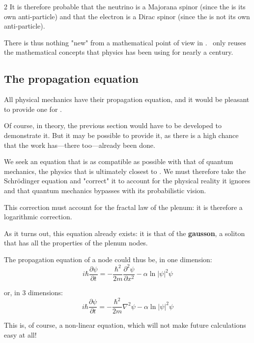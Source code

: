 \begin{multicols}{2}
	It is therefore probable that the neutrino is a Majorana spinor (since the  is its own anti-particle) and that the electron is a Dirac spinor (since the  is not its own anti-particle).
	
	There is thus nothing "new" from a mathematical point of view in \PQ. \PQ\ only reuses the mathematical concepts that physics has been using for nearly a century. \cite{hestenes1966space, lounesto2001clifford}
	
	\subsection{The propagation equation}
	
	All physical mechanics have their propagation equation, and it would be pleasant to provide one for \PQ.
	
	Of course, in theory, the previous section would have to be developed to demonstrate it. But it may be possible to provide it, as there is a high chance that the work has—there too—already been done.
	
	We seek an equation that is as compatible as possible with that of quantum mechanics, the physics that is ultimately closest to \PQ. We must therefore take the Schrödinger equation and "correct" it to account for the physical reality it ignores and that quantum mechanics bypasses with its probabilistic vision.
	
	This correction must account for the fractal law of the plenum: it is therefore a logarithmic correction.
	
	As it turns out, this equation already exists: it is that of the \textbf{gausson}, a soliton that has all the properties of the plenum nodes.\cite{bialynicki1976gaussons}
	
	The propagation equation of a node could thus be, in one dimension:
	\begin{equation*}
		i \hbar {\frac {\partial \psi} {\partial t}}=-\frac {\hbar^2}{2m} \frac {\partial ^{2}\psi }{\partial x^{2}}-\alpha\ln |\psi |^{2}\psi
	\end{equation*}
	
	or, in 3 dimensions:
	\begin{equation*}
		i \hbar {\frac {\partial \psi} {\partial t}}=-\frac {\hbar^2}{2m} \nabla^2 \psi  -\alpha\ln |\psi |^{2}\psi
	\end{equation*}
	
	This is, of course, a non-linear equation, which will not make future calculations easy at all!
	

\end{multicols}
